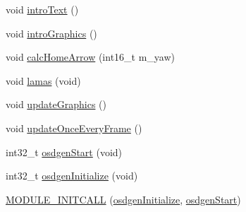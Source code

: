 \begin{DoxyCompactItemize}
\item 
void \hyperlink{group___o_s_d_g_e_n_module_ga637c8a1ae3f761c2724cebbe6f92cce6}{intro\-Text} ()
\item 
void \hyperlink{group___o_s_d_g_e_n_module_gadb49e780d11eb6b7ca55b1a555b55d21}{intro\-Graphics} ()
\item 
void \hyperlink{group___o_s_d_g_e_n_module_ga00457c3ec2ca140e964b76b872c7b57f}{calc\-Home\-Arrow} (int16\-\_\-t m\-\_\-yaw)
\item 
void \hyperlink{group___o_s_d_g_e_n_module_ga78f00a89c30b0c4c25cb300a153efe54}{lamas} (void)
\item 
void \hyperlink{group___o_s_d_g_e_n_module_ga2a784a5e5cba20bd454de8c32e2dcfde}{update\-Graphics} ()
\item 
void \hyperlink{group___o_s_d_g_e_n_module_ga368bd7bc79f8c2f6999dee52aabd7b19}{update\-Once\-Every\-Frame} ()
\item 
int32\-\_\-t \hyperlink{group___o_s_d_g_e_n_module_gab4a7ade39ef421b0eb737497084c6c89}{osdgen\-Start} (void)
\item 
int32\-\_\-t \hyperlink{group___o_s_d_g_e_n_module_gad5c99924576b5d8a3922949f6bc6643c}{osdgen\-Initialize} (void)
\item 
\hyperlink{group___o_s_d_g_e_n_module_gabf1debb6845824a756c3194f8367323a}{\-M\-O\-D\-U\-L\-E\-\_\-\-I\-N\-I\-T\-C\-A\-L\-L} (\hyperlink{group___o_s_d_g_e_n_module_gad5c99924576b5d8a3922949f6bc6643c}{osdgen\-Initialize}, \hyperlink{group___o_s_d_g_e_n_module_gab4a7ade39ef421b0eb737497084c6c89}{osdgen\-Start})
\end{DoxyCompactItemize}

